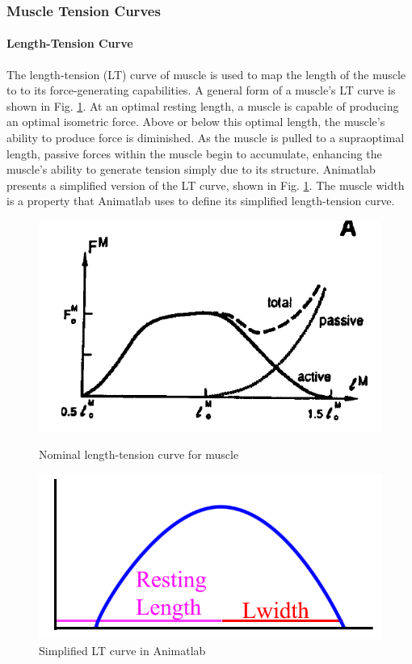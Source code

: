 \documentclass[runningheads,a4paper]{llncs}
\begin{document}
	\subsubsection{Muscle Tension Curves}
		\paragraph{Length-Tension Curve}
			The length-tension (LT) curve of muscle is used to map the length of the muscle to to its force-generating capabilities. A general form of a muscle's LT curve\cite{zajac_muscle_1989} is shown in Fig. \ref{fig:lwidth3}. At an optimal resting length, a muscle is capable of producing an optimal isometric force. Above or below this optimal length, the muscle's ability to produce force is diminished. As the muscle is pulled to a supraoptimal length, passive forces within the muscle begin to accumulate, enhancing the muscle's ability to generate tension simply due to its structure. Animatlab presents a simplified version of the LT curve, shown in Fig. \ref{fig:lwidth3}. The muscle width is a property that Animatlab uses to define its simplified length-tension curve.  \par
			\begin{figure}
				\centering
				\begin{minipage}{0.53\textwidth}
					\centering
					\includegraphics[width=.7\textwidth]{Figures/lwidth3.PNG}
					\caption{Nominal length-tension curve for muscle}
					\label{fig:lwidth3}
				\end{minipage}\hfill
				\begin{minipage}{0.47\textwidth}
					\centering
					\includegraphics[width=\textwidth]{Figures/lwidth7.png}
					\caption{Simplified LT curve in Animatlab}
				\end{minipage}
			\end{figure}
\end{document}
